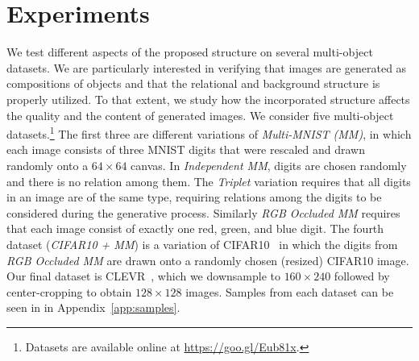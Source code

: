 \documentclass{article}
\begin{document}
\section{Experiments}
We test different aspects of the proposed structure on several multi-object datasets.
We are particularly interested in verifying that images are generated as compositions of objects and that the relational and background structure is properly utilized.
To that extent, we study how the incorporated structure affects the quality and the content of generated images.
We consider five multi-object datasets.\footnote{Datasets are available online at \url{https://goo.gl/Eub81x}.}
The first three are different variations of \emph{Multi-MNIST (MM)}, in which each image consists of three MNIST digits that were rescaled and drawn randomly onto a $64 \times 64$ canvas.
In \emph{Independent MM}, digits are chosen randomly and there is no relation among them.
The \emph{Triplet} variation requires that all digits in an image are of the same type, requiring relations among the digits to be considered during the generative process.
Similarly \emph{RGB Occluded MM} requires that each image consist of exactly one red, green, and blue digit. 
The fourth dataset (\emph{CIFAR10 + MM}) is a variation of CIFAR10~\citep{krizhevsky2009learning} in which the digits from \emph{RGB Occluded MM} are drawn onto a randomly chosen (resized) CIFAR10 image.
Our final dataset is CLEVR~\citep{johnson2017clevr}, which we downsample to $160 \times 240$ followed by center-cropping to obtain $128 \times 128$ images. 
Samples from each dataset can be seen in in Appendix~\ref{app:samples}.
\end{document}
